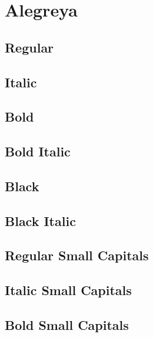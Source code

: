 \documentclass[12pt]{article}
\begin{document}
\sloppy

\section{Alegreya}

\subsection*{Regular}
\lipsum[1]

\subsection*{Italic}
\textit{\lipsum[2]} 

\subsection*{Bold}
\textbf{\lipsum[3]}

\subsection*{Bold Italic}

\textbf{\textit{\lipsum[4]}}

\subsection*{Black}

{\AlegreyaBlack\lipsum[5]}

\subsection*{Black Italic}

\textit{\AlegreyaBlack\lipsum[6]}

\subsection*{Regular Small Capitals}
\textsc{\lipsum[1]}

\subsection*{Italic Small Capitals}
\textsc{\textit{\lipsum[2]}}

\subsection*{Bold Small Capitals}
\textsc{\textbf{\lipsum[3]}}
\end{document}
